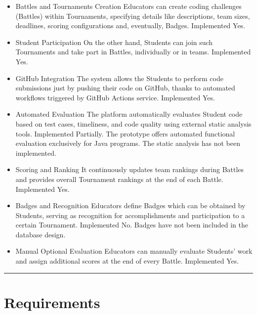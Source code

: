 \documentclass{Configuration_Files/Template}
\begin{document}
\begin{itemize}
\item \textcolor{bluepoli}{Battles and Tournaments Creation} Educators can create coding challenges (Battles) within Tournaments, specifying details like descriptions, team sizes, deadlines, scoring configurations and, eventually, Badges.
\textcolor{bluepoli}{Implemented} Yes.

\item \textcolor{bluepoli}{Student Participation} On the other hand, Students can join such Tournaments and take part in Battles, individually or in teams.
\textcolor{bluepoli}{Implemented} Yes.

\item \textcolor{bluepoli}{GitHub Integration} The system allows the Students to perform code submissions just by pushing their code on GitHub, thanks to automated workflows triggered by GitHub Actions service.
\textcolor{bluepoli}{Implemented} Yes.

\item \textcolor{bluepoli}{Automated Evaluation} The platform automatically evaluates Student code based on test cases, timeliness, and code quality using external static analysis tools.
\textcolor{bluepoli}{Implemented} Partially. The prototype offers automated functional evaluation exclusively for Java programs. The static analysis has not been implemented.

\item \textcolor{bluepoli}{Scoring and Ranking} It continuously updates team rankings during Battles and provides overall Tournament rankings at the end of each Battle.
\textcolor{bluepoli}{Implemented} Yes.

\item \textcolor{bluepoli}{Badges and Recognition} Educators define Badges which can be obtained by Students, serving as recognition for accomplishments and participation to a certain Tournament.
\textcolor{bluepoli}{Implemented} No. Badges have not been included in the database design.

\item \textcolor{bluepoli}{Manual Optional Evaluation} Educators can manually evaluate Students' work and assign additional scores at the end of every Battle.
\textcolor{bluepoli}{Implemented} Yes.
\end{itemize}

{\color{bluepoli}\rule{\linewidth}{0.1pt}}

\section{Requirements}
\end{document}
